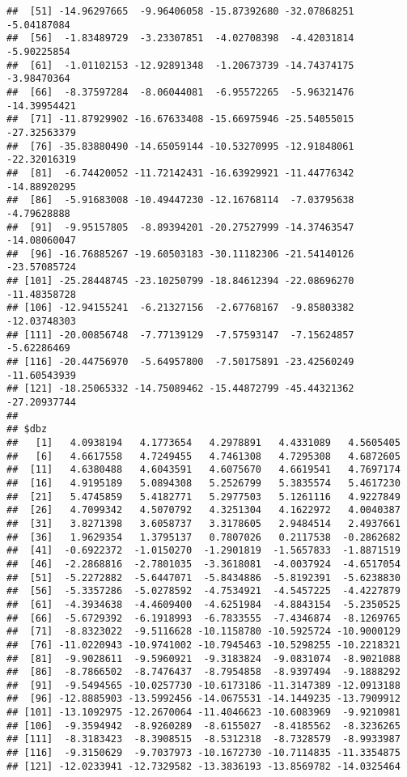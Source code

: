 \documentclass[]{article}
\begin{document}
\begin{verbatim}
##  [51] -14.96297665  -9.96406058 -15.87392680 -32.07868251  -5.04187084
##  [56]  -1.83489729  -3.23307851  -4.02708398  -4.42031814  -5.90225854
##  [61]  -1.01102153 -12.92891348  -1.20673739 -14.74374175  -3.98470364
##  [66]  -8.37597284  -8.06044081  -6.95572265  -5.96321476 -14.39954421
##  [71] -11.87929902 -16.67633408 -15.66975946 -25.54055015 -27.32563379
##  [76] -35.83880490 -14.65059144 -10.53270995 -12.91848061 -22.32016319
##  [81]  -6.74420052 -11.72142431 -16.63929921 -11.44776342 -14.88920295
##  [86]  -5.91683008 -10.49447230 -12.16768114  -7.03795638  -4.79628888
##  [91]  -9.95157805  -8.89394201 -20.27527999 -14.37463547 -14.08060047
##  [96] -16.76885267 -19.60503183 -30.11182306 -21.54140126 -23.57085724
## [101] -25.28448745 -23.10250799 -18.84612394 -22.08696270 -11.48358728
## [106] -12.94155241  -6.21327156  -2.67768167  -9.85803382 -12.03748303
## [111] -20.00856748  -7.77139129  -7.57593147  -7.15624857  -5.62286469
## [116] -20.44756970  -5.64957800  -7.50175891 -23.42560249 -11.60543939
## [121] -18.25065332 -14.75089462 -15.44872799 -45.44321362 -27.20937744
## 
## $dbz
##   [1]   4.0938194   4.1773654   4.2978891   4.4331089   4.5605405
##   [6]   4.6617558   4.7249455   4.7461308   4.7295308   4.6872605
##  [11]   4.6380488   4.6043591   4.6075670   4.6619541   4.7697174
##  [16]   4.9195189   5.0894308   5.2526799   5.3835574   5.4617230
##  [21]   5.4745859   5.4182771   5.2977503   5.1261116   4.9227849
##  [26]   4.7099342   4.5070792   4.3251304   4.1622972   4.0040387
##  [31]   3.8271398   3.6058737   3.3178605   2.9484514   2.4937661
##  [36]   1.9629354   1.3795137   0.7807026   0.2117538  -0.2862682
##  [41]  -0.6922372  -1.0150270  -1.2901819  -1.5657833  -1.8871519
##  [46]  -2.2868816  -2.7801035  -3.3618081  -4.0037924  -4.6517054
##  [51]  -5.2272882  -5.6447071  -5.8434886  -5.8192391  -5.6238830
##  [56]  -5.3357286  -5.0278592  -4.7534921  -4.5457225  -4.4227879
##  [61]  -4.3934638  -4.4609400  -4.6251984  -4.8843154  -5.2350525
##  [66]  -5.6729392  -6.1918993  -6.7833555  -7.4346874  -8.1269765
##  [71]  -8.8323022  -9.5116628 -10.1158780 -10.5925724 -10.9000129
##  [76] -11.0220943 -10.9741002 -10.7945463 -10.5298255 -10.2218321
##  [81]  -9.9028611  -9.5960921  -9.3183824  -9.0831074  -8.9021088
##  [86]  -8.7866502  -8.7476437  -8.7954858  -8.9397494  -9.1888292
##  [91]  -9.5494565 -10.0257730 -10.6173186 -11.3147389 -12.0913188
##  [96] -12.8885903 -13.5992456 -14.0675531 -14.1449235 -13.7909912
## [101] -13.1092975 -12.2670064 -11.4046623 -10.6083969  -9.9210981
## [106]  -9.3594942  -8.9260289  -8.6155027  -8.4185562  -8.3236265
## [111]  -8.3183423  -8.3908515  -8.5312318  -8.7328579  -8.9933987
## [116]  -9.3150629  -9.7037973 -10.1672730 -10.7114835 -11.3354875
## [121] -12.0233941 -12.7329582 -13.3836193 -13.8569782 -14.0325464
\end{verbatim}
\end{document}
